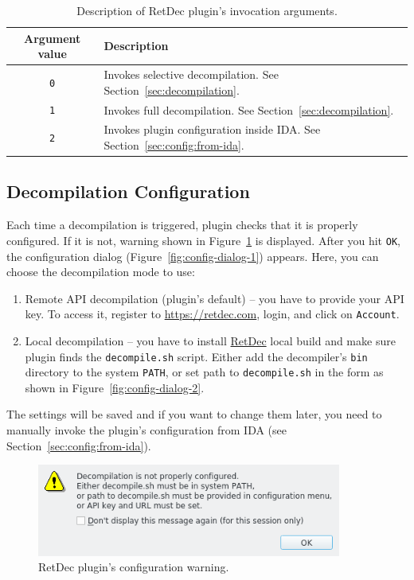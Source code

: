 \documentclass[pdftex, a4paper,12pt, oneside, svgnames]{article}
\begin{document}
\begin{table}[!ht]
\centering
\caption{Description of RetDec plugin's invocation arguments.}
\label{table:plugin-args}
\begin{tabular}{cl}
\textbf{Argument value} & \textbf{Description}\\
\hline
\texttt{0} & Invokes selective decompilation. See Section~\ref{sec:decompilation}. \\
\texttt{1} & Invokes full decompilation. See Section~\ref{sec:decompilation}. \\
\texttt{2} & Invokes plugin configuration inside IDA. See Section~\ref{sec:config:from-ida}.
\end{tabular}
\end{table}

\subsection{Decompilation Configuration}
Each time a decompilation is triggered, plugin checks that it is properly configured. If it is not, warning shown in Figure~\ref{fig:config-warning} is displayed. After you hit \texttt{OK}, the configuration dialog (Figure~\ref{fig:config-dialog-1}) appears. Here, you can choose the decompilation mode to use:
\begin{enumerate}
	\item Remote API decompilation (plugin's default) -- you have to provide your API key. To access it, register to \url{https://retdec.com}, login, and click on \texttt{Account}.
	\item Local decompilation -- you have to install \href{https://github.com/avast-tl/retdec}{RetDec} local build and make sure plugin finds the \texttt{decompile.sh} script. Either add the decompiler's \texttt{bin} directory to the system \texttt{PATH}, or set path to \texttt{decompile.sh} in the form as shown in Figure~\ref{fig:config-dialog-2}.
\end{enumerate}

The settings will be saved and if you want to change them later, you need to manually invoke the plugin's configuration from IDA (see Section~\ref{sec:config:from-ida}).

\begin{figure}[!ht]
	\centering
	\includegraphics[width=10cm]{figures/config-warning}
	\caption{RetDec plugin's configuration warning.}
	\label{fig:config-warning}
\end{figure}
\end{document}

